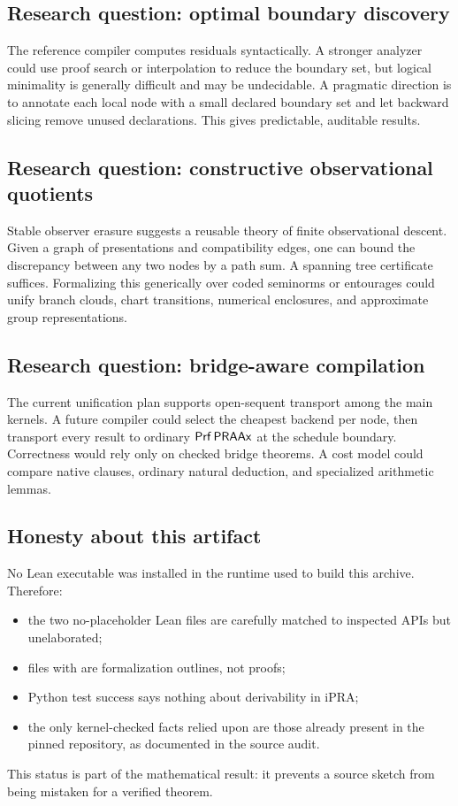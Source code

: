 \subsection{Research question: optimal boundary discovery}

The reference compiler computes residuals syntactically.  A stronger analyzer could use proof search
or interpolation to reduce the boundary set, but logical minimality is generally difficult and may be
undecidable.  A pragmatic direction is to annotate each local node with a small declared boundary set
and let backward slicing remove unused declarations.  This gives predictable, auditable results.

\subsection{Research question: constructive observational quotients}

Stable observer erasure suggests a reusable theory of finite observational descent.  Given a graph of
presentations and compatibility edges, one can bound the discrepancy between any two nodes by a path
sum.  A spanning tree certificate suffices.  Formalizing this generically over coded seminorms or
entourages could unify branch clouds, chart transitions, numerical enclosures, and approximate group
representations.

\subsection{Research question: bridge-aware compilation}

The current unification plan supports open-sequent transport among the main kernels.  A future
compiler could select the cheapest backend per node, then transport every result to ordinary
\(\mathsf{Prf}\,\mathsf{PRAAx}\) at the schedule boundary.  Correctness would rely only on checked bridge theorems.
A cost model could compare native clauses, ordinary natural deduction, and specialized arithmetic
lemmas.

\subsection{Honesty about this artifact}

No Lean executable was installed in the runtime used to build this archive.  Therefore:

\begin{itemize}
\item the two no-placeholder Lean files are carefully matched to inspected APIs but unelaborated;
\item files with  are formalization outlines, not proofs;
\item Python test success says nothing about derivability in iPRA;
\item the only kernel-checked facts relied upon are those already present in the pinned repository,
      as documented in the source audit.
\end{itemize}

This status is part of the mathematical result: it prevents a source sketch from being mistaken for a
verified theorem.
